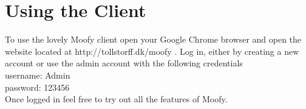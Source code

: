 \section{Using the Client}
\label{app:usermanual}
To use the lovely Moofy client open your Google Chrome browser and 
open the website located at http://tollstorff.dk/moofy . Log in, either
by creating a new account or use the admin account with the following credentials\\
username: Admin\\
password: 123456\\

Once logged in feel free to try out all the features of Moofy.